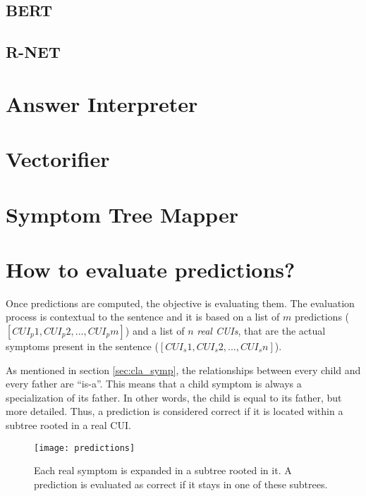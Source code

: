 \subsection{BERT}


\subsection{R-NET}



\section{Answer Interpreter}
\label{sec:answer_interpreter}



\section{Vectorifier}
\label{sec:vectorifier}



\section{Symptom Tree Mapper}
\label{sec:symptom_tree_mapper}



\section{How to evaluate predictions?}
\label{sec:eval_results}
Once predictions are computed, the objective is evaluating them. The evaluation process is contextual to the sentence and it is based on a list of $m$ predictions ($[CUI_{p}1, CUI_{p}2, ..., CUI_{p}m]$) and a list of $n$ \emph{real CUIs}, that are the actual symptoms present in the sentence ($[CUI_{s}1, CUI_{s}2, ..., CUI_{s}n]$).

As mentioned in section \ref{sec:cla_symp}, the relationships between every child and every father are ``is-a''. This means that a child symptom is always a specialization of its father. In other words, the child is equal to its father, but more detailed. Thus, a prediction is considered correct if it is located within a subtree rooted in a real CUI.

\begin{figure}[h]
\centering
\texttt{[image: predictions]}
\caption{Each real symptom is expanded in a subtree rooted in it. A prediction is evaluated as correct if it stays in one of these subtrees.}
\medskip
\end{figure}


